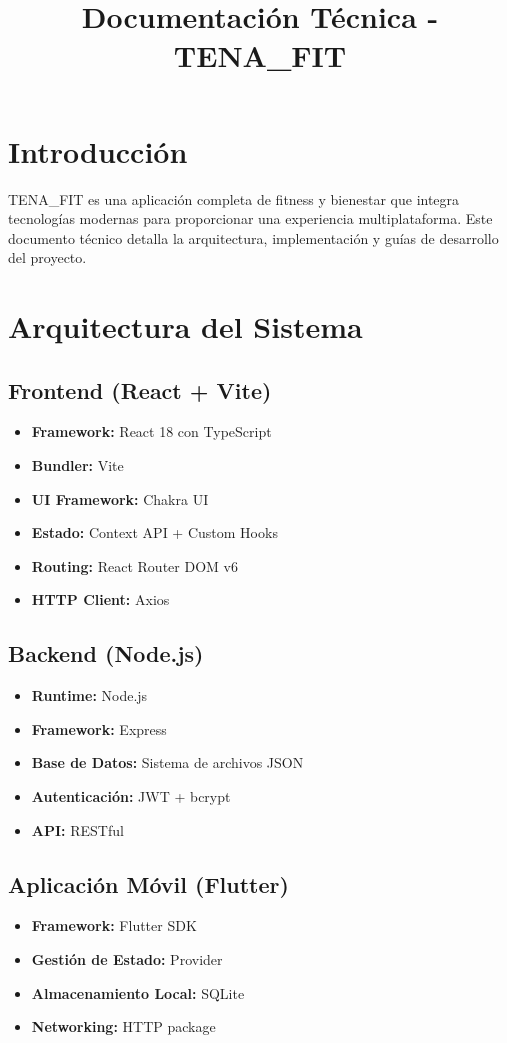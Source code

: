 \documentclass[12pt,a4paper]{article}
\title{Documentación Técnica - TENA\_FIT}
\begin{document}
\maketitle
\tableofcontents

\section{Introducción}
TENA\_FIT es una aplicación completa de fitness y bienestar que integra tecnologías modernas para proporcionar una experiencia multiplataforma. Este documento técnico detalla la arquitectura, implementación y guías de desarrollo del proyecto.

\section{Arquitectura del Sistema}

\subsection{Frontend (React + Vite)}
\begin{itemize}
    \item \textbf{Framework:} React 18 con TypeScript
    \item \textbf{Bundler:} Vite
    \item \textbf{UI Framework:} Chakra UI
    \item \textbf{Estado:} Context API + Custom Hooks
    \item \textbf{Routing:} React Router DOM v6
    \item \textbf{HTTP Client:} Axios
\end{itemize}

\subsection{Backend (Node.js)}
\begin{itemize}
    \item \textbf{Runtime:} Node.js
    \item \textbf{Framework:} Express
    \item \textbf{Base de Datos:} Sistema de archivos JSON
    \item \textbf{Autenticación:} JWT + bcrypt
    \item \textbf{API:} RESTful
\end{itemize}

\subsection{Aplicación Móvil (Flutter)}
\begin{itemize}
    \item \textbf{Framework:} Flutter SDK
    \item \textbf{Gestión de Estado:} Provider
    \item \textbf{Almacenamiento Local:} SQLite
    \item \textbf{Networking:} HTTP package
\end{itemize}
\end{document}
